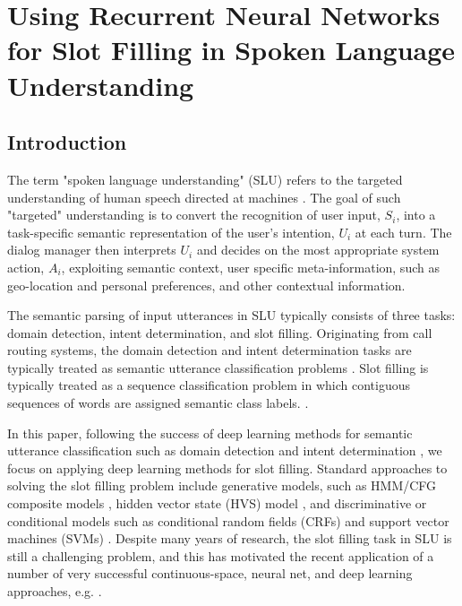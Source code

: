 \chapter{Using Recurrent Neural Networks for Slot Filling in Spoken Language Understanding \label{chap:rnn}}

\section{Introduction}

The term "spoken language understanding" (SLU) refers to the targeted
understanding of human speech directed at machines \citep{rnn1}. The goal of such
"targeted" understanding is to convert the recognition of user input, $S_i$, into
a task-specific semantic representation of the user's intention, $U_i$ at each
turn. The dialog manager then interprets $U_i$ and decides on the most
appropriate system action, $A_i$, exploiting semantic context, user specific
meta-information, such as geo-location and personal preferences, and other
contextual information.

The semantic parsing of input utterances in SLU typically consists of three
tasks: domain detection, intent determination, and slot filling. Originating
from call routing systems, the domain detection and intent determination tasks
are typically treated as semantic utterance classification problems \citep{rnn2,rnn3,rnn4,rnn30}.
Slot filling is typically treated as a sequence classification problem in which
contiguous sequences of words are assigned semantic class labels.
\citep{rnn5,rnn7,rnn31,rnn32,rnn33,rnn34,rnn40,rnn55}. 

In this paper, following the success of deep learning methods for semantic
utterance classification such as domain detection \citep{rnn30} and intent determination
\citep{rnn13,rnn39,rnn50}, we focus on applying deep learning methods for slot filling.
Standard approaches to solving the slot filling problem include generative
models, such as HMM/CFG composite models \citep{rnn31,rnn5,rnn53}, hidden vector state (HVS)
model \citep{rnn33}, and discriminative or conditional models such as conditional random
fields (CRFs) \citep{rnn6, rnn7, rnn32, rnn34, rnn40, rnn51, rnn54} and support vector machines (SVMs) \citep{rnn52}.
Despite many years of research, the slot filling task in SLU is still a
challenging problem, and this has motivated the recent application of a number
of very successful continuous-space, neural net, and deep learning approaches,
e.g. \citep{rnn13,rnn15,rnn24,rnn30,rnn56}. 

